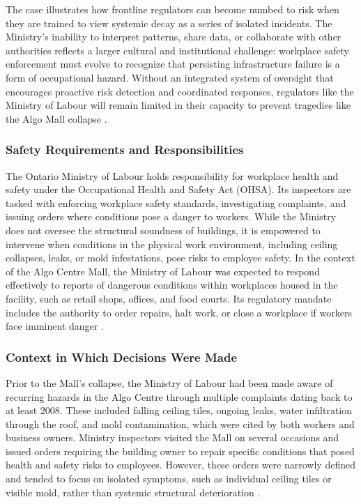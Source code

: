 \documentclass[12pt]{article}
\begin{document}
The case illustrates how frontline regulators can become numbed to risk when they are trained to view systemic decay as a series of isolated incidents. The Ministry's inability to interpret patterns, share data, or collaborate with other authorities reflects a larger cultural and institutional challenge: workplace safety enforcement must evolve to recognize that persisting infrastructure failure is a form of occupational hazard. Without an integrated system of oversight that encourages proactive risk detection and coordinated responses, regulators like the Ministry of Labour will remain limited in their capacity to prevent tragedies like the Algo Mall collapse \cite[p140-149]{AlgoLakeReport1}.

\subsubsection*{Safety Requirements and Responsibilities}
The Ontario Ministry of Labour holds responsibility for workplace health and safety under the Occupational Health and Safety Act (OHSA). Its inspectors are tasked with enforcing workplace safety standards, investigating complaints, and issuing orders where conditions pose a danger to workers. While the Ministry does not oversee the structural soundness of buildings, it is empowered to intervene when conditions in the physical work environment, including ceiling collapses, leaks, or mold infestations, pose risks to employee safety. In the context of the Algo Centre Mall, the Ministry of Labour was expected to respond effectively to reports of dangerous conditions within workplaces housed in the facility, such as retail shops, offices, and food courts. Its regulatory mandate includes the authority to order repairs, halt work, or close a workplace if workers face imminent danger \cite[p3-4, p140-145]{AlgoLakeReport1}.

\subsubsection*{Context in Which Decisions Were Made}

Prior to the Mall's collapse, the Ministry of Labour had been made aware of recurring hazards in the Algo Centre through multiple complaints dating back to at least 2008. These included falling ceiling tiles, ongoing leaks, water infiltration through the roof, and mold contamination, which were cited by both workers and business owners. Ministry inspectors visited the Mall on several occasions and issued orders requiring the building owner to repair specific conditions that posed health and safety risks to employees. However, these orders were narrowly defined and tended to focus on isolated symptoms, such as individual ceiling tiles or visible mold, rather than systemic structural deterioration \cite[p145-149]{AlgoLakeReport1}.
\end{document}
